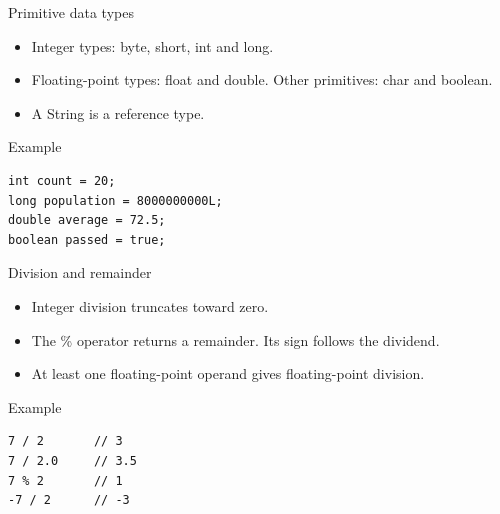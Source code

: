 \documentclass[10pt,aspectratio=169]{beamer}
\begin{document}
\begin{frame}[fragile,t]{Primitive data types}
\begin{itemize}
\item Integer types: byte, short, int and long.
\item Floating-point types: float and double. Other primitives: char and boolean.
\item A String is a reference type.
\end{itemize}
\vspace{1mm}\begin{block}{Example}
\begin{lstlisting}
int count = 20;
long population = 8000000000L;
double average = 72.5;
boolean passed = true;
\end{lstlisting}
\end{block}
\end{frame}

\begin{frame}[fragile,t]{Division and remainder}
\begin{itemize}
\item Integer division truncates toward zero.
\item The \% operator returns a remainder. Its sign follows the dividend.
\item At least one floating-point operand gives floating-point division.
\end{itemize}
\vspace{1mm}\begin{block}{Example}
\begin{lstlisting}
7 / 2       // 3
7 / 2.0     // 3.5
7 % 2       // 1
-7 / 2      // -3
\end{lstlisting}
\end{block}
\end{frame}
\end{document}

